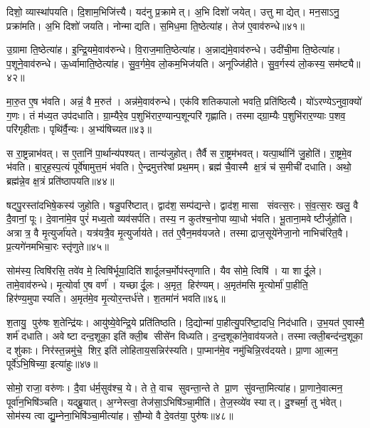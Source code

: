 दिशो॒ व्यास्था॑पयति।
दि॒शाम॒भिजि॑त्त्यै।
यद॑नु प्र॒क्रामेत्।
अ॒भि दिशो॑ जयेत्।
उत्तु माद्येत्।
मन॒साऽनु॒ प्रक्रा॑मति।
अ॒भि दिशो॑ जयति।
नोन्माद्यति।
स॒मिध॒मा ति॒ष्ठेत्या॑ह।
तेज॑ ए॒वाव॑रुन्धे॥४१॥

उ॒ग्रामा ति॒ष्ठेत्या॑ह।
इ॒न्द्रि॒यमे॒वाव॑रुन्धे।
वि॒राज॒माति॒ष्ठेत्या॑ह।
अ॒न्नाद्य॑मे॒वाव॑रुन्धे।
उदी॑ची॒मा ति॒ष्ठेत्या॑ह।
प॒शूने॒वाव॑रुन्धे।
ऊ॒र्ध्वामाति॒ष्ठेत्या॑ह।
सु॒व॒र्गमे॒व लो॒कम॒भिज॑यति।
अनूज्जि॑हीते।
सु॒व॒र्गस्य॑ लो॒कस्य॒ सम॑ष्ट्यै॥४२॥

मा॒रु॒त ए॒ष भ॑वति।
अन्नं॒ वै म॒रुत॑।
अन्न॑मे॒वाव॑रुन्धे।
एक॑विशतिकपालो भवति॒ प्रति॑ष्ठित्यै।
यो॑ऽरण्येऽनुवा॒क्यो॑ ग॒णः।
तं म॑ध्य॒त उप॑दधाति।
ग्रा॒म्यैरे॒व प॒शुभि॑रार॒ण्यान्प॒शून्परि॑ गृह्णाति।
तस्माद्ग्रा॒म्यैः प॒शुभि॑रार॒ण्याः प॒शव॒ परि॑गृहीताः।
पृथि॑र्वै॒न्यः।
अ॒भ्य॑षिच्यत॥४३॥

स रा॒ष्ट्रन्नाभ॑वत्।
स ए॒तानि॑ पा॒र्थान्य॑पश्यत्।
तान्य॑जुहोत्।
तैर्वै स रा॒ष्ट्रम॑भवत्।
यत्पा॒र्थानि॑ जु॒होति॑।
रा॒ष्ट्रमे॒व भ॑वति।
बा॒र्॒ह॒स्प॒त्यं पूर्वे॑षामुत्त॒मं भ॑वति।
ऐ॒न्द्रमुत्त॑रेषां प्रथ॒मम्।
ब्रह्म॑ चै॒वास्मै क्ष॒त्रं च॑ स॒मीची॑ दधाति।
अथो॒ ब्रह्म॑न्ने॒व क्ष॒त्रं प्रति॑ष्ठापयति॥४४॥

षट्पु॒रस्ता॑दभिषे॒कस्य॑ जुहोति।
षडु॒परि॑ष्टात्।
द्वाद॑श॒ सम्प॑द्यन्ते।
द्वाद॑श॒ मासा संवत्स॒रः।
सं॒व॒त्स॒रः खलु॒ वै दै॒वानां॒ पूः।
दे॒वाना॑मे॒व पुरं॑ मध्य॒तो व्यव॑सर्पति।
तस्य॒ न कुत॑श्च॒नोपाव्या॒धो भ॑वति।
भू॒ताना॒मवेष्टीर्जुहोति।
अत्रात्र॒ वै मृ॒त्युर्जा॑यते।
यत्र॑यत्रै॒व मृ॒त्युर्जाय॑ते।
तत॑ ए॒वैन॒मव॑यजते।
तस्माद्राज॒सूये॑नेजा॒नो नाभिच॑रित॒वै।
प्र॒त्यगे॑नमभिचा॒रः स्तृ॑णुते॥४५॥\anuvakamend[रु॒न्धे॒ सम॑ष्ट्या असिच्यत स्थापयति॒ जाय॑ते॒ पञ्च॑ च]

सोम॑स्य॒ त्विषि॑रसि॒ तवे॑व मे॒ त्विषि॑र्भूया॒दिति॑ शार्दूलच॒र्मोप॑स्तृणाति।
यैव सोमे॒ त्विषि॑।
या शार्दू॒ले।
तामे॒वाव॑रुन्धे।
मृ॒त्योर्वा ए॒ष वर्ण॑।
यच्छार्दू॒लः।
अ॒मृत॒ हिर॑ण्यम्।
अ॒मृत॑मसि मृ॒त्योर्मा॑ पा॒हीति॒ हिर॑ण्य॒मुपास्यति।
अ॒मृत॑मे॒व मृ॒त्योर॒न्तर्ध॑त्ते।
श॒तमा॑नं भवति॥४६॥

श॒तायु॒ पुरु॑षः श॒तेन्द्रि॑यः।
आयु॑ष्ये॒वेन्द्रि॒ये प्रति॑तिष्ठति।
दि॒द्योन्मा॑ पा॒हीत्यु॒परि॑ष्टा॒दधि॒ निद॑धाति।
उ॒भ॒यत॑ ए॒वास्मै॒ शर्म॑ दधाति।
अवेष्टा दन्द॒शूका॒ इति॑ क्ली॒ब सीसे॑न विध्यति।
द॒न्द॒शूका॑ने॒वाव॑यजते।
तस्मात्क्ली॒बन्द॑न्द॒शूका॒ दशु॑काः।
निर॑स्त॒न्नमु॑चे॒ शिर॒ इति॑ लोहिताय॒सन्निर॑स्यति।
पा॒प्मान॑मे॒व नमु॑चिन्नि॒रव॑दयते।
प्रा॒णा आ॒त्मन॒ पूर्वे॑ऽभि॒षिच्या॒ इत्या॑हुः॥४७॥

सोमो॒ राजा॒ वरु॑णः।
दै॒वा ध॑र्म॒सुव॑श्च॒ ये।
ते ते॒ वाच सुवन्ता॒न्ते ते प्रा॒ण सु॑वन्ता॒मित्या॑ह।
प्रा॒णाने॒वात्मन॒ पूर्वा॑न॒भिषि॑ञ्चति।
यद्ब्रू॒यात्।
अ॒ग्नेस्त्वा॒ तेज॑सा॒ऽभिषि॑ञ्चा॒मीति॑।
ते॒ज॒स्व्ये॑व स्यात्।
दु॒श्चर्मा॒ तु भ॑वेत्।
सोम॑स्य त्वा द्यु॒म्नेना॒भिषि॑ञ्चा॒मीत्या॑ह।
सौ॒म्यो वै दे॒वत॑या॒ पुरु॑षः॥४८॥

